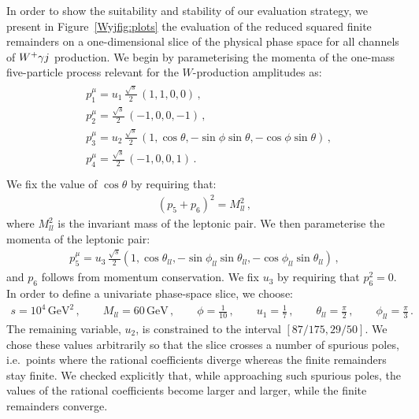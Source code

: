 \documentclass[main.tex]{subfiles}
\begin{document}
In order to show the suitability and stability of our evaluation strategy, we present in Figure~\ref{Wyjfig:plots} the evaluation of the reduced squared finite remainders on a one-dimensional slice of the physical phase space for all channels of $W^+\gamma j$ production. We begin by parameterising the momenta of the one-mass five-particle process relevant for the $W$-production amplitudes as:
\begin{align} \label{Wyjeq:unislice1}
\begin{aligned}
& p_1^{\mu} = u_1 \, \frac{\sqrt{s}}{2} \, \left(1,1,0,0 \right) \,, \\
& p_2^{\mu} =  \frac{\sqrt{s}}{2} \, \left(-1,0,0,-1 \right) \,, \\
& p_3^{\mu} = u_2 \, \frac{\sqrt{s}}{2} \, \left(1,\cos\theta,-\sin \phi \sin \theta, -\cos \phi \sin\theta \right) \,, \\
& p_4^{\mu} =  \frac{\sqrt{s}}{2} \, \left(-1,0,0,1 \right) \,. \\
\end{aligned}
\end{align}
We fix the value of $\cos\theta$ by requiring that: 
\begin{align} \label{Wyjeq:unislice2}
(p_5+p_6)^2 = M^2_{ll} \,, 
\end{align}
where $M^2_{ll}$ is the invariant mass of the leptonic pair.
We then parameterise the momenta of the leptonic pair:
\begin{align} \label{Wyjeq:unislice3}
p_5^{\mu} = u_3 \, \frac{\sqrt{s}}{2}  \left(1,\cos\theta_{ll},-\sin \phi_{ll} \sin \theta_{ll}, -\cos \phi_{ll} \sin\theta_{ll} \right) \,,
\end{align}
and $p_6$ follows from momentum conservation.
We fix $u_3$ by requiring that $p_6^2 = 0$. In order to define a univariate phase-space slice, we choose:
\begin{align} \label{Wyjeq:unisliceparams}
s = 10^4 \, \text{GeV}^2 \,, \qquad M_{ll} = 60 \, \text{GeV}  \,, \qquad \phi = \frac{1}{10} \,, \qquad u_1 = \frac{1}{7}\,, \qquad \theta_{ll} = \frac{\pi}{2} \,, \qquad \phi_{ll} = \frac{\pi}{3} \,.
\end{align}
The remaining variable, $u_2$, is constrained to the interval $[87/175, 29/50]$. We chose these values arbitrarily so that the slice crosses a number of spurious poles, i.e.\ points where the rational coefficients diverge whereas the finite remainders stay finite. We checked explicitly that, while approaching such spurious poles, the values of the rational coefficients become larger and larger, while the finite remainders converge. 
\end{document}
